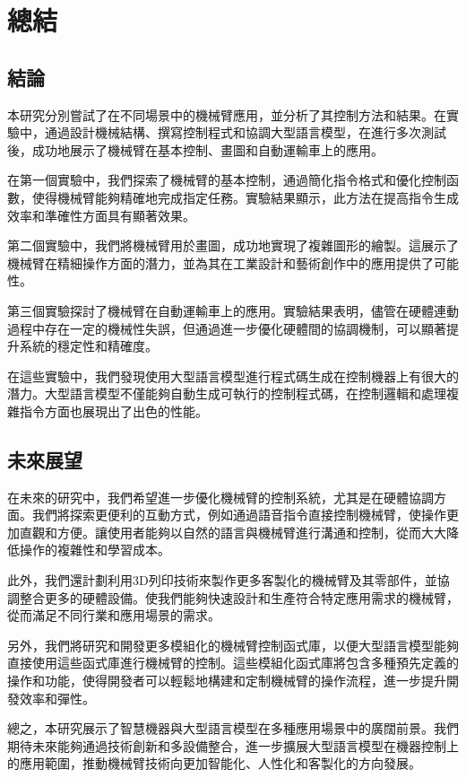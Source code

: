 \documentclass[class=NCU_thesis, crop=false]{standalone}
\begin{document}
\chapter{總結}

\section{結論}

本研究分別嘗試了在不同場景中的機械臂應用，並分析了其控制方法和結果。在實驗中，通過設計機械結構、撰寫控制程式和協調大型語言模型，在進行多次測試後，成功地展示了機械臂在基本控制、畫圖和自動運輸車上的應用。

在第一個實驗中，我們探索了機械臂的基本控制，通過簡化指令格式和優化控制函數，使得機械臂能夠精確地完成指定任務。實驗結果顯示，此方法在提高指令生成效率和準確性方面具有顯著效果。

第二個實驗中，我們將機械臂用於畫圖，成功地實現了複雜圖形的繪製。這展示了機械臂在精細操作方面的潛力，並為其在工業設計和藝術創作中的應用提供了可能性。

第三個實驗探討了機械臂在自動運輸車上的應用。實驗結果表明，儘管在硬體連動過程中存在一定的機械性失誤，但通過進一步優化硬體間的協調機制，可以顯著提升系統的穩定性和精確度。

在這些實驗中，我們發現使用大型語言模型進行程式碼生成在控制機器上有很大的潛力。大型語言模型不僅能夠自動生成可執行的控制程式碼，在控制邏輯和處理複雜指令方面也展現出了出色的性能。
\section{未來展望}

在未來的研究中，我們希望進一步優化機械臂的控制系統，尤其是在硬體協調方面。我們將探索更便利的互動方式，例如通過語音指令直接控制機械臂，使操作更加直觀和方便。讓使用者能夠以自然的語言與機械臂進行溝通和控制，從而大大降低操作的複雜性和學習成本。

此外，我們還計劃利用3D列印技術來製作更多客製化的機械臂及其零部件，並協調整合更多的硬體設備。使我們能夠快速設計和生產符合特定應用需求的機械臂，從而滿足不同行業和應用場景的需求。

另外，我們將研究和開發更多模組化的機械臂控制函式庫，以便大型語言模型能夠直接使用這些函式庫進行機械臂的控制。這些模組化函式庫將包含多種預先定義的操作和功能，使得開發者可以輕鬆地構建和定制機械臂的操作流程，進一步提升開發效率和彈性。

總之，本研究展示了智慧機器與大型語言模型在多種應用場景中的廣闊前景。我們期待未來能夠通過技術創新和多設備整合，進一步擴展大型語言模型在機器控制上的應用範圍，推動機械臂技術向更加智能化、人性化和客製化的方向發展。
\end{document}
